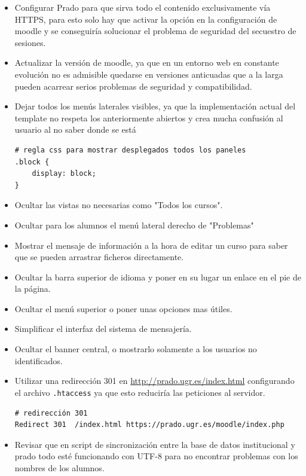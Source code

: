 \begin{itemize}
	\item Configurar Prado para que sirva todo el contenido exclusivamente vía HTTPS, para esto solo hay que activar la opción en la configuración de moodle y se conseguiría solucionar el problema de seguridad del secuestro de sesiones.

	\item Actualizar la versión de moodle, ya que en un entorno web en constante evolución no es admisible quedarse en versiones anticuadas que a la larga pueden acarrear serios problemas de seguridad y compatibilidad.

	\item Dejar todos los menús laterales visibles, ya que la implementación actual del template no respeta los anteriormente abiertos y crea mucha confusión al usuario al no saber donde se está
\begin{lstlisting}
# regla css para mostrar desplegados todos los paneles
.block {
	display: block;
}
\end{lstlisting}

	\item Ocultar las vistas no necesarias como "Todos los cursos".
	\item Ocultar para los alumnos el menú lateral derecho de "Problemas"
	\item Mostrar el mensaje de información a la hora de editar un curso para saber que se pueden arrastrar ficheros directamente.
	\item Ocultar la barra superior de idioma y poner en su lugar un enlace en el pie de la página.
	\item Ocultar el menú superior o poner unas opciones mas útiles.
	\item Simplificar el interfaz del sistema de mensajería.
	\item Ocultar el banner central, o mostrarlo solamente a los usuarios no identificados.
	\item Utilizar una redirección 301 en \url{http://prado.ugr.es/index.html} configurando el archivo \texttt{.htaccess} ya que esto reduciría las peticiones al servidor.
\begin{lstlisting}
# redirección 301
Redirect 301  /index.html https://prado.ugr.es/moodle/index.php
\end{lstlisting}
	
	\item Revisar que en script de sincronización entre la base de datos institucional y prado todo esté funcionando con UTF-8 para no encontrar problemas con los nombres de los alumnos.



\end{itemize}
